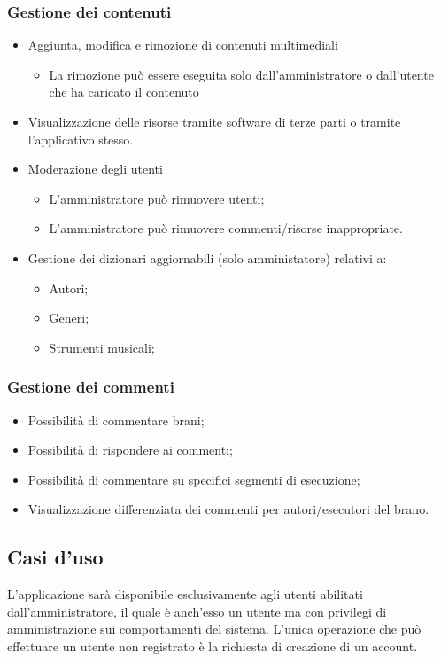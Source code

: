 \documentclass[a4paper]{article}
\begin{document}
\subsubsection{Gestione dei contenuti}
\begin{itemize}
    \item Aggiunta, modifica e rimozione di contenuti multimediali
    \begin{itemize}
        \item La rimozione può essere eseguita solo dall’amministratore o dall’utente che ha caricato il contenuto
    \end{itemize}
    \item Visualizzazione delle risorse tramite software di terze parti o tramite l’applicativo stesso.
    \item Moderazione degli utenti
    \begin{itemize}
        \item L’amministratore può rimuovere utenti;
        \item L’amministratore può rimuovere commenti/risorse inappropriate.
    \end{itemize}
    \item Gestione dei dizionari aggiornabili (solo amministatore) relativi a:
    \begin{itemize}
        \item Autori;
        \item Generi;
        \item Strumenti musicali;
    \end{itemize}
\end{itemize}

\subsubsection{Gestione dei commenti}
\begin{itemize}
    \item Possibilità di commentare brani;
    \item Possibilità di rispondere ai commenti;
    \item Possibilità di commentare su specifici segmenti di esecuzione;
    \item Visualizzazione differenziata dei commenti per autori/esecutori del brano.
\end{itemize}

\subsection{Casi d'uso}
L’applicazione sarà disponibile esclusivamente agli utenti abilitati dall’amministratore, il quale è anch’esso un utente ma con privilegi di amministrazione sui comportamenti del sistema. L’unica operazione che può effettuare un utente non registrato è la richiesta di creazione di un account. 
\end{document}
